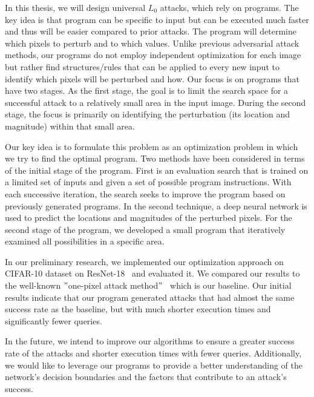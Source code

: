 \documentclass[11pt]{article}
\begin{document}
In this thesis, we will design universal $L_0$ attacks, which rely on programs.
The key idea is that program can be specific to input but can be executed much faster and thus will be easier compared to prior attacks.
The program will determine which pixels to perturb and to which values. 
 Unlike previous adversarial attack methods, our programs do not employ independent optimization for each image but rather find structures/rules that can be applied to every new input to identify which pixels will be perturbed and how. 
 Our focus is on programs that have two stages.
 As the first stage, the goal is to limit the search space for a successful attack to a relatively small area in the input image.
 During the second stage, the focus is primarily on identifying the perturbation (its location and magnitude) within that small area.
 
 Our key idea is to formulate this problem as an optimization problem in which we try to find the optimal program.
 Two methods have been considered in terms of the initial stage of the program.
 First is an evaluation search that is trained on a limited set of inputs and given a set of possible program instructions.
 With each successive iteration, the search seeks to improve the program based on previously generated programs.
 In the second technique, a deep neural network is used to predict the locations and magnitudes of the perturbed pixels.
 For the second stage of the program, we developed a small program that iteratively examined all possibilities in a specific area.
 
 In our preliminary research, we implemented our optimization approach on CIFAR-10 dataset on ResNet-18~\cite{he2015deep} and evaluated it.
 We compared our results to the well-known \("\)one-pixel attack method\("\)~\cite{OnePixelAttack} which is our baseline.
 Our initial results indicate that our program generated attacks that had almost the same success rate as the baseline, but with much shorter execution times and significantly fewer queries.

In the future, we intend to improve our algorithms to ensure a greater success rate of the attacks and shorter execution times with fewer queries.
Additionally, we would like to leverage our programs to provide a better understanding of the network's decision boundaries and the factors that contribute to an attack's success.
\end{document}
